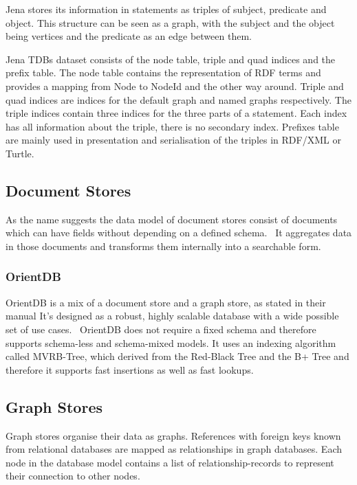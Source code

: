 Jena stores its information in statements as triples of subject, predicate and object.
This structure can be seen as a graph, with the subject and the object being vertices and the predicate as an edge between them.

Jena TDBs dataset consists of the node table, triple and quad indices and the prefix table.
The node table contains the representation of RDF terms and provides a mapping from Node to NodeId and the other way around.
Triple and quad indices are indices for the default graph and named graphs respectively.
The triple indices contain three indices for the three parts of a statement.
Each index has all information about the triple,
there is no secondary index.
Prefixes table are mainly used in presentation and serialisation of the triples in RDF/XML or Turtle.~\cite{ApacheTDB}

\subsection{Document Stores}
As the name suggests the data model of document stores consist of documents which can have fields without depending on a defined schema.~\cite{OrientDB}
It aggregates data in those documents and transforms them internally into a searchable form.~\cite{Techopedia2017}

\subsubsection{OrientDB}
OrientDB is a mix of a document store and a graph store,
as stated in their manual 
It's designed as a robust, highly scalable database with a wide possible set of use cases.~\cite{OrientDB}
OrientDB does not require a fixed schema and therefore supports schema-less and schema-mixed models.
It uses an indexing algorithm called MVRB-Tree,
which derived from the Red-Black Tree and the B+ Tree and therefore it supports fast insertions as well as fast lookups.~\cite{Abubakar2014}

\subsection{Graph Stores}
\label{ch:background:se:graphStores}
Graph stores organise their data as graphs.
References with foreign keys known from relational databases are mapped as relationships in graph databases.
Each node in the database model contains a list of relationship-records to represent their connection to other nodes.~\cite{NeoTechnologyInc.2016}

